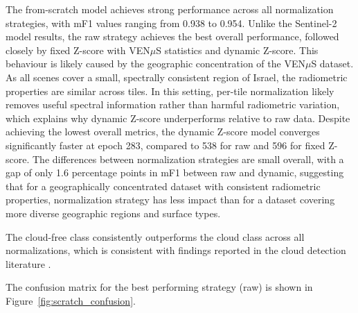 The from-scratch model achieves strong performance across all normalization strategies, with mF1 values ranging from 0.938 to 0.954. Unlike the Sentinel-2 model results, the raw strategy achieves the best overall performance, followed closely by fixed Z-score with VEN$\mu$S statistics and dynamic Z-score. This behaviour is likely caused by the geographic concentration of the VEN$\mu$S dataset. As all scenes cover a small, spectrally consistent region of Israel, the radiometric properties are similar across tiles. In this setting, per-tile normalization likely removes useful spectral information rather than harmful radiometric variation, which explains why dynamic Z-score underperforms relative to raw data. Despite achieving the lowest overall metrics, the dynamic Z-score model converges significantly faster at epoch 283, compared to 538 for raw and 596 for fixed Z-score. The differences between normalization strategies are small overall, with a gap of only 1.6 percentage points in mF1 between raw and dynamic, suggesting that for a geographically concentrated dataset with consistent radiometric properties, normalization strategy has less impact than for a dataset covering more diverse geographic regions and surface types.

The cloud-free class consistently outperforms the cloud class across all normalizations, which is consistent with findings reported in the cloud detection literature \cite{pesek2022, wright2025}.

The confusion matrix for the best performing strategy (raw) is shown in Figure~\ref{fig:scratch_confusion}.

